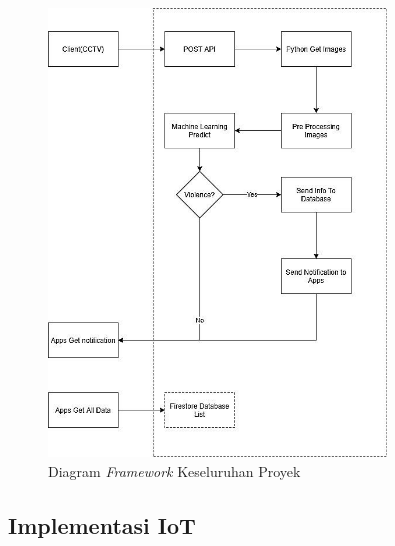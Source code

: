 \begin{figure} [!ht]
  \centering
  \includegraphics[width=0.8\textwidth]{gambar/framework.jpg}
  \caption{Diagram \textit{Framework} Keseluruhan Proyek}
  \label{fig:framework}
\end{figure}

\subsection{Implementasi IoT}